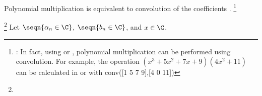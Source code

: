 Polynomial multiplication is equivalent to
convolution  of the coefficients .
\footnote{
  : In fact, using \texttrademark\hspace{1ex} or \texttrademark,
  polynomial multiplication can be performed using convolution.
  For example, the operation
  $(x^3 + 5x^2 + 7x + 9)(4x^2 + 11)$ can be calculated in
  \texttrademark\hspace{1ex} or \texttrademark\hspace{1ex} with
  conv([1 5 7 9],[4 0 11])
  }
\begin{theorem}
\label{thm:polymult}
\footnote{}
Let $\seqn{\alpha_n\in\C}$, $\seqn{b_n\in\C}$, and $x\in\C$.
\end{theorem}
